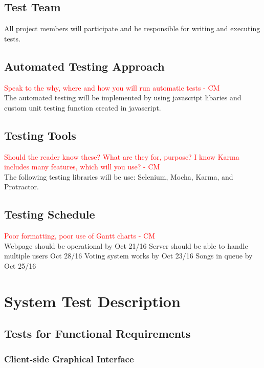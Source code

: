 \documentclass[12pt, titlepage]{article}
\begin{document}
\subsection{Test Team}
All project members will participate and be responsible for writing and executing tests.

\subsection{Automated Testing Approach}
\textcolor{red}{Speak to the why, where and how you will run automatic tests - CM} \\
The automated testing will be implemented by using javascript libaries and custom unit testing function created in javascript.
\subsection{Testing Tools}
\textcolor{red}{Should the reader know these? What are they for, purpose? I know Karma includes many features, which will you use? - CM} \\
The following testing libraries will be use: Selenium, Mocha, Karma, and Protractor. 

\subsection{Testing Schedule}
\textcolor{red}{Poor formatting, poor use of Gantt charts - CM} \\
Webpage should be operational by Oct 21/16
Server should be able to handle multiple users Oct 28/16
Voting system works by Oct 23/16
Songs in queue by Oct 25/16


\section{System Test Description}

\subsection{Tests for Functional Requirements}

\subsubsection{Client-side Graphical Interface}
\end{document}
